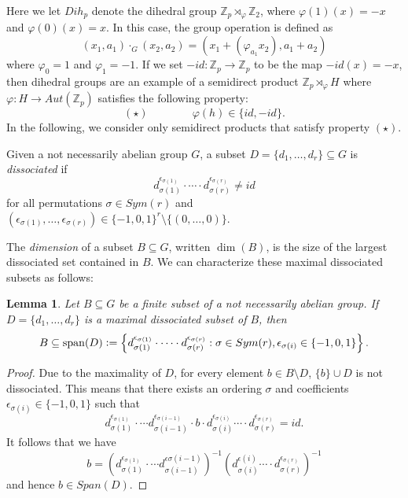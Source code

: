 \documentclass[11pt]{amsart}
\newtheorem{lemma}[theorem]{Lemma}
\theoremstyle{definition}
\DeclareMathOperator{\Span}{span}
\begin{document}
Here we let $Dih_p$ denote the dihedral group $\mathbb{Z}_{p} \rtimes_{\varphi} \mathbb{Z}_2$, where $\varphi(1)(x)=-x$ and $\varphi(0)(x)=x$. In this case, the group operation is defined as
$$(x_1, a_1)\cdot_G (x_2, a_2)=(x_1 + (\varphi_{a_1} x_2), a_1+ a_2)$$
 where $\varphi_{0}=1$ and $\varphi_{1}=-1$.
If we set $-id: \mathbb{Z}_p\rightarrow \mathbb{Z}_p$ to be the map $-id(x)=-x$, then dihedral groups are an example of a semidirect product $\mathbb{Z}_{p} \rtimes_{\varphi} H$ where $\varphi: H \rightarrow Aut(\mathbb{Z}_p)$ satisfies the following property:
$$(\star) \qquad\qquad \varphi(h)\in \{id, -id\}.$$
In the following, we consider only semidirect products that satisfy property $(\star)$.

Given a not necessarily abelian group $G$, a subset $D=\{d_1, \ldots, d_r\} \subseteq G$ is \emph{dissociated} if
$$d_{\sigma(1)}^{\epsilon_{\sigma(1)}} \cdot \cdots \cdot d_{\sigma(r)}^ {\epsilon_{\sigma(r)}} \neq id$$
for all permutations $\sigma\in Sym(r)$ and $(\epsilon_{\sigma(1)}, \ldots, \epsilon_{\sigma(r)}) \in \{-1,0,1\}^r \setminus \{(0,\ldots, 0)\}$.

The \emph{dimension} of a subset $B \subseteq G$, written $\dim(B)$, is the size of the largest dissociated set contained in $B$.
We can characterize these maximal dissociated subsets as follows:
\begin{lemma}\label{lem:dissociated-set-generator}
Let $B \subseteq G$ be a finite subset of a not necessarily abelian group.  If $D=\{d_1, \ldots, d_r\}$ is a maximal dissociated subset of $B$, then
$$B \subseteq \Span(D) \vcentcolon= \left\{d_{\sigma(1)}^{\epsilon_{\sigma(1)}} \cdot \cdots \cdot d_{\sigma(r)}^ {\epsilon_{\sigma(r)}}: \sigma \in Sym(r), \epsilon_{\sigma(i)}\in\{-1,0,1\}\right\}.$$
\end{lemma}

\begin{proof}
Due to the maximality of $D$, for every element $b\in B\setminus D$, $\{b\}\cup D$ is not dissociated. This means that there exists an ordering $\sigma$ and coefficients $ \epsilon_{\sigma(i)}\in\{-1,0,1\}$ such that
$$d_{\sigma(1)}^{\epsilon_{\sigma(1)}} \cdot \cdots d_{\sigma(i-1)}^{\epsilon_{\sigma(i-1)}}\cdot b\cdot d_{\sigma(i)}^{\epsilon_{\sigma(i)}}\cdots \cdot d_{\sigma(r)}^ {\epsilon_{\sigma(r)}} = id.$$
It follows that we have
$$b=\left(d_{\sigma(1)}^{\epsilon_{\sigma(1)}} \cdot \cdots d_{\sigma(i-1)}^{\epsilon{\sigma(i-1)}}\right)^{-1} \left(d_{\sigma(i)}^{\epsilon(i)}\cdots \cdot d_{\sigma(r)}^ {\epsilon_{\sigma(r)}}\right)^{-1}$$
and hence $b\in Span(D)$.
\end{proof}
\end{document}
